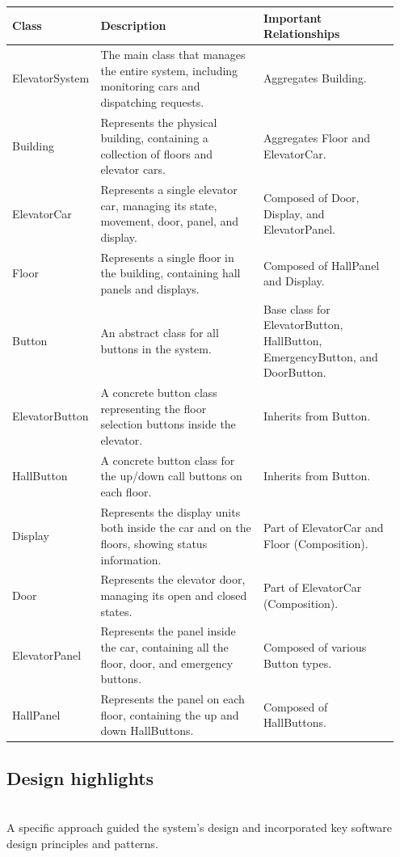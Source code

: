 \begin{center}
\begin{tabular}{|p{0.18\linewidth}|p{0.42\linewidth}|p{0.35\linewidth}|}
\hline
\textbf{Class} & \textbf{Description} & \textbf{Important Relationships} \\
\hline
ElevatorSystem & The main class that manages the entire system, including monitoring cars and dispatching requests. & Aggregates Building. \\
\hline
Building & Represents the physical building, containing a collection of floors and elevator cars. & Aggregates Floor and ElevatorCar. \\
\hline
ElevatorCar & Represents a single elevator car, managing its state, movement, door, panel, and display. & Composed of Door, Display, and ElevatorPanel. \\
\hline
Floor & Represents a single floor in the building, containing hall panels and displays. & Composed of HallPanel and Display. \\
\hline
Button & An abstract class for all buttons in the system. & Base class for ElevatorButton, HallButton, EmergencyButton, and DoorButton. \\
\hline
ElevatorButton & A concrete button class representing the floor selection buttons inside the elevator. & Inherits from Button. \\
\hline
HallButton & A concrete button class for the up/down call buttons on each floor. & Inherits from Button. \\
\hline
Display & Represents the display units both inside the car and on the floors, showing status information. & Part of ElevatorCar and Floor (Composition). \\
\hline
Door & Represents the elevator door, managing its open and closed states. & Part of ElevatorCar (Composition). \\
\hline
ElevatorPanel & Represents the panel inside the car, containing all the floor, door, and emergency buttons. & Composed of various Button types. \\
\hline
HallPanel & Represents the panel on each floor, containing the up and down HallButtons. & Composed of HallButtons. \\
\hline
\end{tabular}
\end{center}


\subsection{Design highlights}\label{vh-fL2v1tF1jS54oEHykc}
\\
A specific approach guided the system's design and incorporated key software design principles and patterns.

